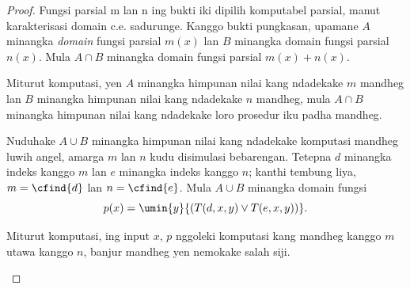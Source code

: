 \documentclass[../../../include/open-logic-section]{subfiles}
\begin{document}
\begin{proof}
Fungsi parsial m lan n ing bukti iki dipilih komputabel parsial, manut karakterisasi domain c.e. sadurunge.
Kanggo bukti pungkasan, upamane $A$
minangka \emph{domain} fungsi parsial
$m(x)$ lan $B$ minangka domain fungsi
parsial $n(x)$. Mula $A \cap B$
minangka domain fungsi parsial $m(x) +
n(x)$.

\begin{explain}
Miturut komputasi, yen $A$ minangka
himpunan nilai kang ndadekake $m$ mandheg
lan $B$ minangka himpunan nilai kang
ndadekake $n$ mandheg, mula $A \cap B$
minangka himpunan nilai kang ndadekake
loro prosedur iku padha mandheg.
\end{explain}

Nuduhake $A \cup B$ minangka himpunan
nilai kang ndadekake komputasi mandheg
luwih angel, amarga $m$ lan $n$ kudu
disimulasi bebarengan. Tetepna $d$
minangka indeks kanggo $m$ lan $e$
minangka indeks kanggo $n$; kanthi
tembung liya, $m = \cfind{d}$ lan
$n = \cfind{e}$. Mula $A \cup B$
minangka domain fungsi
\[
p(x) = \umin{y}{(T(d,x,y) \lor T(e,x,y))}.
\]
\begin{explain}
Miturut komputasi, ing input $x$,
$p$ nggoleki komputasi kang mandheg
kanggo $m$ utawa kanggo $n$,
banjur mandheg yen nemokake salah siji.
\end{explain}
\end{proof}
\end{document}
